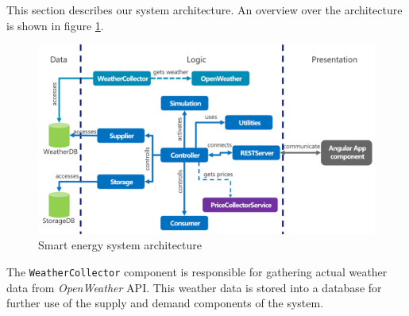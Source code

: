 This section describes our system architecture.
An overview over the architecture is shown in figure \ref{fig:architecture}.
\begin{figure}[!h]
	\centering
		\includegraphics[width=1.00\textwidth]{../figures/Architecture.pdf}
	\caption{Smart energy system architecture}
	\label{fig:architecture}
\end{figure}

The \texttt{WeatherCollector} component is responsible for gathering actual weather data from \textit{OpenWeather} API.
This weather data is stored into a database for further use of the supply and demand components of the system.

